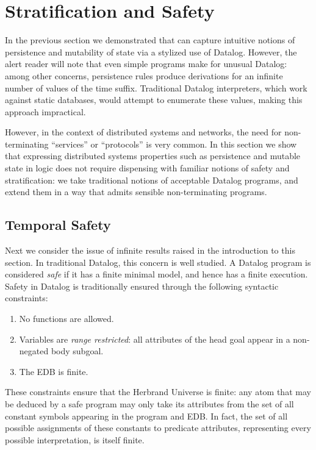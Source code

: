 \section{Stratification and Safety}
\label{sec:safety}
In the previous section we demonstrated that \slang can capture
intuitive notions of persistence and mutability of state via a
stylized use of Datalog.  However, the alert reader will note that
even simple \slang programs make for unusual Datalog: among other
concerns, persistence rules produce derivations for an infinite number
of values of the time suffix.  Traditional Datalog interpreters, which
work against static databases, would attempt to enumerate these
values, making this approach impractical.

However, in the context of distributed systems and networks, the need
for non-terminating ``services'' or ``protocols'' is very common.  In
this section we show that expressing distributed systems properties
such as persistence and mutable state in logic does not require
dispensing with familiar notions of safety and stratification: we take
traditional notions of acceptable Datalog programs, and extend them in
a way that admits sensible non-terminating programs.




\subsection{Temporal Safety}
Next we consider the issue of infinite results raised in the introduction to this section.
In traditional Datalog, this concern is well studied.
A Datalog program is considered {\em safe} if it has a finite minimal model, and hence has
a finite execution.  Safety in Datalog is traditionally ensured
through the following syntactic constraints:

\begin{enumerate}
\item No functions are allowed.
\item Variables are \emph{range restricted}: all attributes of the head goal
appear in a non-negated body subgoal.
\item The EDB is finite.
\end{enumerate}

These constraints ensure that the Herbrand Universe is finite: any atom that
may be deduced by a safe program may only take its attributes from the 
set of all constant symbols appearing in the program and EDB\@.
In fact, the set of all possible assignments of these constants to predicate
attributes, representing every possible interpretation, is itself finite. 

